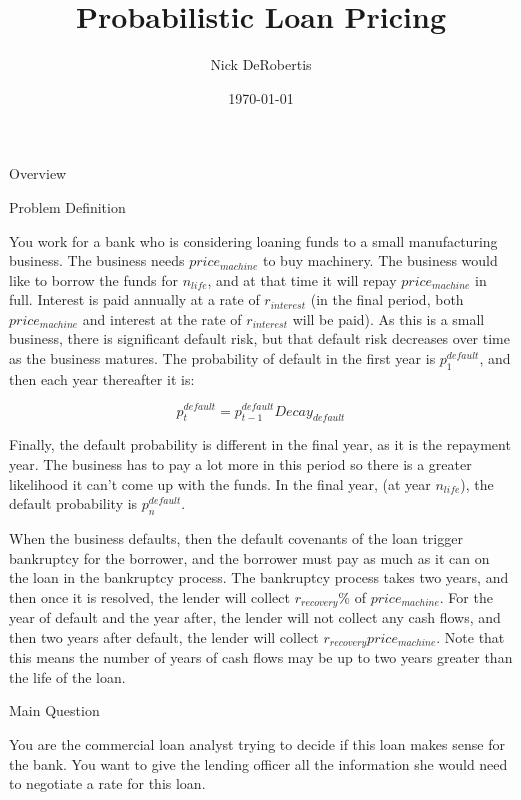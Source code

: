 \documentclass[]{article}
\begin{document}
\title{Probabilistic Loan Pricing}
\author{Nick DeRobertis}
\date{\today}
\maketitle
\begin{section}{Overview}
\begin{subsection}{Problem Definition}

    You work for a bank who is considering loaning funds to a small manufacturing business. The business needs 
    $price_{machine}$ to buy machinery. The business would like to borrow the funds for 
    $n_{life}$, and at that time it will repay $price_{machine}$ in full. Interest is 
    paid annually at a rate of $r_{interest}$ (in the final period, both 
    $price_{machine}$ and interest at the rate of $r_{interest}$ will be paid). As this is a small 
    business, there is significant default risk, but that default risk decreases over time as the business 
    matures. The probability of default in the first year is $p_1^{default}$, and then each 
    year thereafter it is:
    
\begin{equation}
	p_t^{default} = p_{t-1}^{default} Decay_{default}
\end{equation}

    Finally, the default probability is different in the final year, as it is the repayment year. The business has to
    pay a lot more in this period so there is a greater likelihood it can't come up with the funds. In the final year,
    (at year $n_{life}$), the default probability is $p_n^{default}$. 
    
    When the business defaults, then the default
    covenants of the loan trigger bankruptcy for the borrower, and the borrower must pay as much as it can on the loan 
    in the bankruptcy process. The bankruptcy process takes two years, and then once it is resolved, the lender will 
    collect $r_{recovery}$\% of $price_{machine}$. For the year of default and the year after,
    the lender will not collect any cash flows, and then two years after default, the lender will collect 
    $r_{recovery}price_{machine}$. Note that this means the number of years of cash flows may be up to two
    years greater than the life of the loan.
    
\end{subsection}
\begin{subsection}{Main Question}

    You are the commercial loan analyst trying to decide if this loan makes sense for the bank. You want to give the
    lending officer all the information she would need to negotiate a rate for this loan.
    

\end{subsection}
\end{section}
\end{document}
